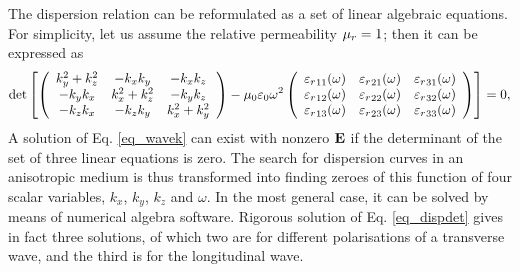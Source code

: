 The dispersion relation can be reformulated \cite[pp. 667]{born1999book} as a set of linear algebraic equations. 
For simplicity, let us assume the relative permeability $\mu_r = 1$; then it can be expressed as 
\begin{equation} \det\left[\left(\begin{array}{ccc} 
	k_y^2+k_z^2  	& -k_x k_y 		& -k_x k_z \\ 
	-k_y k_x 		& k_x^2+k_z^2	& -k_y k_z \\ 
	-k_z k_x 		& -k_z k_y		& k_x^2+k_y^2
	\end{array} \right)
-
	\mu_0 \varepsilon_0 \omega^2
	\left(\begin{array}{ccc} 
	{\varepsilon_r}_{11}(\omega) & {\varepsilon_r}_{21}(\omega) & {\varepsilon_r}_{31}(\omega)  \\
	{\varepsilon_r}_{12}(\omega) & {\varepsilon_r}_{22}(\omega) & {\varepsilon_r}_{32}(\omega)  \\
	{\varepsilon_r}_{13}(\omega) & {\varepsilon_r}_{23}(\omega) & {\varepsilon_r}_{33}(\omega)  
	\end{array} \right) \right] = 0, \label{eq_dispdet}\end{equation}
A solution of Eq. \ref{eq_wavek} can exist with nonzero $\mathbf{E}$ if the determinant of the set of three linear equations is zero. The search for dispersion curves in an anisotropic medium is thus transformed into finding zeroes of this function of four scalar variables, $k_x$, $k_y$, $k_z$ and $\omega$.
In the most general case, it can be solved by means of numerical algebra software. 
Rigorous solution of Eq. \ref{eq_dispdet} gives in fact three solutions, of which two are for different polarisations of a transverse wave, and the third is for the longitudinal wave. 

